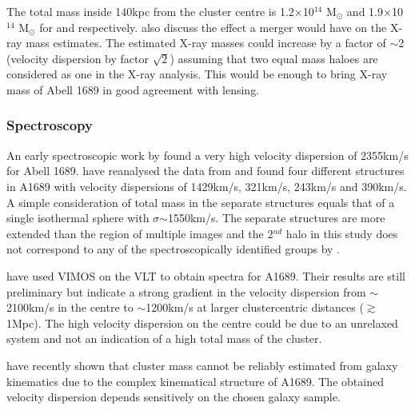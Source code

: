 \documentclass[useAMS,usenatbib]{mn2e}
\newcounter{one}   \setcounter{one}{1}
\newcounter{two}   \setcounter{two}{2}
\newcounter{four}  \setcounter{four}{4}
\begin{document}
The total mass inside 140kpc from the cluster centre is
1.2$\times$10$^{14}$ M$_{\odot}$ and 1.9$\times$10$^{14}$ M$_{\odot}$
for \citet{andersson:04} and \citet{xue:02}
respectively. \citet{andersson:04} also discuss the effect a merger
would have on the \mbox{X-ray} mass estimates. The estimated
\mbox{X-ray} masses could increase by a factor of $\sim$2 (velocity
dispersion by factor $\sqrt{2}$) assuming that two equal mass haloes
are considered as one in the \mbox{X-ray} analysis. This would be
enough to bring \mbox{X-ray} mass of Abell 1689 in good agreement with
lensing.

\subsubsection{Spectroscopy}
\label{sec:literature_spec}
An early spectroscopic work by \citet{teague:90} found a very high
velocity dispersion of 2355km/s for Abell 1689. \citet{girardi:97}
have reanalysed the data from \citet{teague:90} and found four
different structures in A1689 with velocity dispersions of 1429km/s,
321km/s, 243km/s and 390km/s. A simple consideration of total mass in
the separate structures equals that of a single isothermal sphere with
$\sigma$$\sim$1550km/s. The separate structures are more extended than
the region of multiple images and the 2$^{nd}$ halo in this study does
not correspond to any of the spectroscopically identified groups by
\citet{girardi:97}.

\citet{czoske:04} have used VIMOS on the VLT to obtain spectra for
A1689. Their results are still preliminary but indicate a strong
gradient in the velocity dispersion from $\sim$2100km/s in the centre
to $\sim$1200km/s at larger clustercentric distances
($\gtrsim$1Mpc). The high velocity dispersion on the centre could be
due to an unrelaxed system and not an indication of a high total mass
of the cluster.

\citet{lokas:05} have recently shown that cluster mass cannot be
reliably estimated from galaxy kinematics due to the complex
kinematical structure of A1689. The obtained velocity dispersion
depends sensitively on the chosen galaxy sample.
\end{document}
